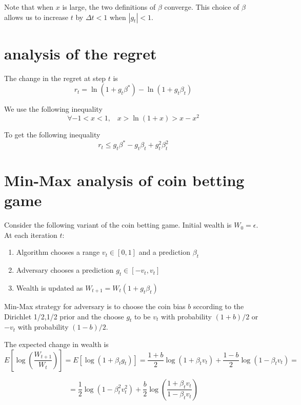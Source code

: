 \documentclass{article}
\newcommand{\dt}{\Delta t}
\begin{document}
Note that when $x$ is large, the two definitions of $\beta$ converge.
This choice of $\beta$ allows us to increase $t$ by $\dt < 1$ when $|g_t|<1$.


\section{analysis of the regret}

The change in the regret at step $t$ is 
\[
r_t = \ln (1+g_t\beta^*) - \ln (1+g_t \beta_t)
\]

We use the following inequality
\[
\forall -1 < x < 1, \;\;\; x > \ln (1+x) > x-x^2
\]

To get the following inequality
\[
r_t \leq g_t \beta^* - g_t \beta_t +g_t^2 \beta_t^2
\]

\section{Min-Max analysis of coin betting game}

Consider the following variant of the coin betting game. Initial wealth  is $W_0=\epsilon$. At each iteration $t$:
\begin{enumerate}
    \item Algorithm chooses a range $v_t \in [0,1]$ and a prediction $\beta_t$
    \item Adversary chooses a prediction $g_t \in [-v_t,v_t]$
    \item Wealth is updated as $W_{t+1} = W_t (1+g_t \beta_t)$
\end{enumerate}

Min-Max strategy for adversary is to choose the coin bias $b$ sccording to the Dirichlet 1/2,1/2 prior and the choose $g_t$ to be $v_t$ with probability $(1+b)/2$  or $-v_t$ with probability $(1-b)/2$.

The expected change in wealth is 
\[
E\left[\log \left(\frac{W_{t+1}}{W_t}\right)\right] 
= E\left[ \log (1+\beta_t g_t)\right] = 
\frac{1+b}{2}\log (1+\beta_t v_t) + \frac{1-b}{2}\log(1-\beta_t v_t) = 
\]

\[
= \frac{1}{2}\log(1-\beta_t^2 v_t^2) + \frac{b}{2}\log\left( \frac{1+\beta_t v_t}{1-\beta_t v_t}\right)
\]
\end{document}
